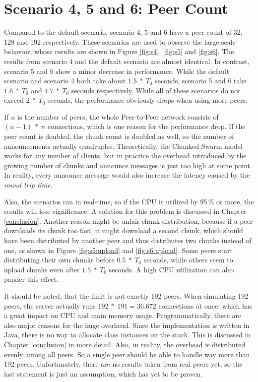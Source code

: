 \pagebreak
\section{Scenario 4, 5 and 6: Peer Count}
\label{evaluation:456}

Compared to the default scenario, scenario 4, 5 and 6 have a peer count of 32, 128 and 192 respectively. These scenarios are used to observe the large-scale behavior, whose results are shown in Figure \ref{fig:s4}, \ref{fig:s5} and \ref{fig:s6}. The results from scenario 4 and the default scenario are almost identical. In contrast, scenario 5 and 6 show a minor decrease in performance. While the default scenario and scenario 4 both take about $1.5\:*\:T_0$ seconds, scenario 5 and 6 take $1.6\:*\:T_0$ and $1.7\:*\:T_0$ seconds respectively. While all of these scenarios do not exceed $2\:*\:T_0$ seconds, the performance obviously drops when using more peers.

If $n$ is the number of peers, the whole Peer-to-Peer network consists of $(n-1)\:*\:n$ connections, which is one reason for the performance drop. If the peer count is doubled, the chunk count is doubled as well, so the number of announcements actually quadruples. Theoretically, the Chunked-Swarm model works for any number of clients, but in practice the overhead introduced by the growing number of chunks and announce messages is just too high at some point. In reality, every announce message would also increase the latency caused by the \emph{round trip time}. 

Also, the scenarios ran in real-time, so if the CPU is utilized by 95\,\% or more, the results will lose significance. A solution for this problem is discussed in Chapter \ref{conclusion}. Another reason might be unfair chunk distribution, because if a peer downloads its chunk too fast, it might download a second chunk, which should have been distributed by another peer and thus distributes two chunks instead of one, as shown in Figure \ref{fig:s5:upload} and \ref{fig:s6:upload}. Some peers start distributing their own chunks before $0.5\:*\:T_0$ seconds, while others seem to upload chunks even after $1.5\:*\:T_0$ seconds. A high CPU utilization can also pander this effect.

It should be noted, that the limit is not exactly 192 peers. When simulating 192 peers, the server actually runs $192\:*\:191=36.672$ connections at once, which has a great impact on CPU and main memory usage. Programmatically, there are also major reasons for the huge overhead. Since the implementation is written in Java, there is no way to allocate class instances on the stack. This is discussed in Chapter \ref{conclusion} in more detail. Also, in reality, the overhead is distributed evenly among all peers. So a single peer should be able to handle way more than 192 peers. Unfortunately, there are no results taken from real peers yet, so the last statement is just an assumption, which has yet to be proven.

